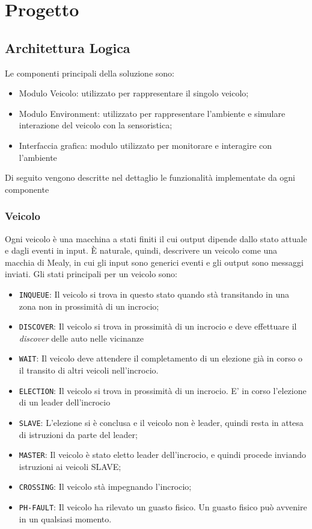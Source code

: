 \documentclass{memoir}
\begin{document}
\chapter{Progetto}

\section{Architettura Logica}
\label{sec:arclog}
Le componenti principali della soluzione sono:
\begin{itemize}
\item Modulo Veicolo: utilizzato per rappresentare il singolo veicolo;
\item Modulo Environment: utilizzato per rappresentare l'ambiente e simulare
  interazione del veicolo con la sensoristica;
\item Interfaccia grafica: modulo utilizzato per monitorare e interagire con l'ambiente
\end{itemize}

Di seguito vengono descritte nel dettaglio le funzionalità implementate da ogni componente
\subsection{Veicolo}
Ogni veicolo è una macchina a stati finiti il cui output dipende dallo stato
attuale e dagli eventi in input. È naturale, quindi, descrivere un veicolo come
una macchia di Mealy, in cui gli input sono generici eventi e gli output sono
messaggi inviati. Gli stati principali per un veicolo sono:
\begin{itemize}
\item \texttt{INQUEUE}: Il veicolo si trova in questo stato quando stà
  transitando in una zona non in prossimità di un incrocio;
\item \texttt{DISCOVER}: Il veicolo si trova in prossimità di un incrocio e deve
  effettuare il \emph{discover} delle auto nelle vicinanze
\item \texttt{WAIT}: Il veicolo deve attendere il completamento di un elezione
  già in corso o il transito di altri veicoli nell'incrocio.
\item \texttt{ELECTION}: Il veicolo si trova in prossimità di un incrocio. E' in
  corso l'elezione di un leader dell'incrocio
\item \texttt{SLAVE}: L'elezione si è conclusa e il veicolo non è leader, quindi
  resta in attesa di istruzioni da parte del leader;
\item \texttt{MASTER}: Il veicolo è stato eletto leader dell'incrocio, e quindi
  procede inviando istruzioni ai veicoli SLAVE;
\item \texttt{CROSSING}: Il veicolo stà impegnando l'incrocio;
\item \texttt{PH-FAULT}: Il veicolo ha rilevato un guasto fisico. Un guasto
  fisico può avvenire in un qualsiasi momento.
\end{itemize}
\end{document}
